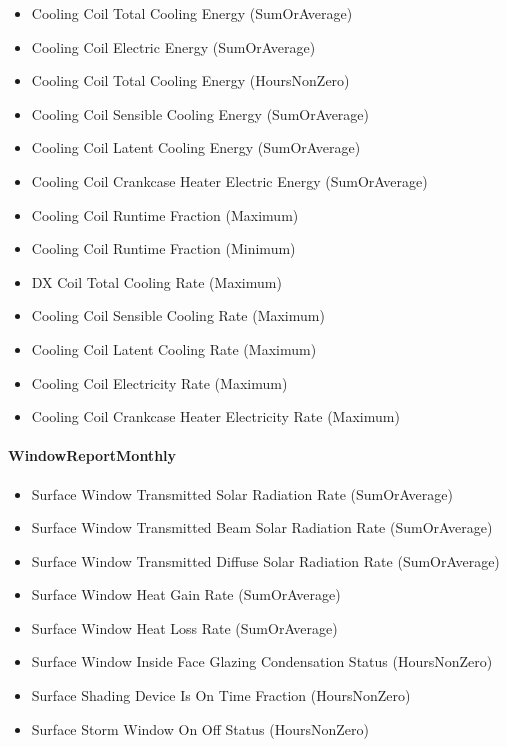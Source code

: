 \begin{itemize}
\item
  Cooling Coil Total Cooling Energy (SumOrAverage)
\item
  Cooling Coil Electric Energy (SumOrAverage)
\item
  Cooling Coil Total Cooling Energy (HoursNonZero)
\item
  Cooling Coil Sensible Cooling Energy (SumOrAverage)
\item
  Cooling Coil Latent Cooling Energy (SumOrAverage)
\item
  Cooling Coil Crankcase Heater Electric Energy (SumOrAverage)
\item
  Cooling Coil Runtime Fraction (Maximum)
\item
  Cooling Coil Runtime Fraction (Minimum)
\item
  DX Coil Total Cooling Rate (Maximum)
\item
  Cooling Coil Sensible Cooling Rate (Maximum)
\item
  Cooling Coil Latent Cooling Rate (Maximum)
\item
  Cooling Coil Electricity Rate (Maximum)
\item
  Cooling Coil Crankcase Heater Electricity Rate (Maximum)
\end{itemize}

\paragraph{WindowReportMonthly}\label{windowreportmonthly}

\begin{itemize}
\item
  Surface Window Transmitted Solar Radiation Rate (SumOrAverage)
\item
  Surface Window Transmitted Beam Solar Radiation Rate (SumOrAverage)
\item
  Surface Window Transmitted Diffuse Solar Radiation Rate (SumOrAverage)
\item
  Surface Window Heat Gain Rate (SumOrAverage)
\item
  Surface Window Heat Loss Rate (SumOrAverage)
\item
  Surface Window Inside Face Glazing Condensation Status (HoursNonZero)
\item
  Surface Shading Device Is On Time Fraction (HoursNonZero)
\item
  Surface Storm Window On Off Status (HoursNonZero)
\end{itemize}

